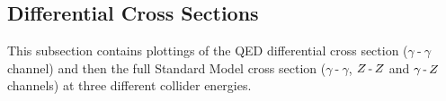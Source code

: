 \documentclass[]{article}
\begin{document}
\subsection{Differential Cross Sections}\label{ssec:differentialfigs}

This subsection contains plottings of the QED differential cross section ($\gamma\operatorname{-}\gamma$ channel) and then the full Standard Model cross section ($\gamma\operatorname{-}\gamma$, $Z \operatorname{-}Z $ and $\gamma\operatorname{-}Z $ channels) at three different collider energies.

\begin{figure}[H]
	\vspace{10pt}
	\centering
	\subfloat[SM]{
		\label{fig:diffsmbelow}
}
\end{figure}
\end{document}
